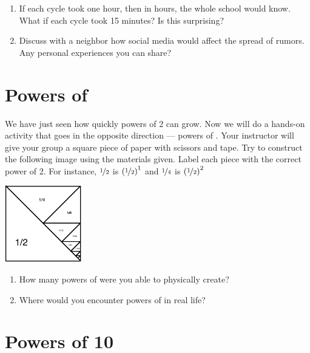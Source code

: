 \documentclass{article}
\begin{document}
\begin{enumerate}
  \vfill

  \clearpage
\item If each cycle took one hour, then in \underline{\hspace{0.5in}} hours, the whole school would know. What if each cycle took 15 minutes? Is this surprising?

  \vfill
  
\item Discuss with a neighbor how social media would affect the spread of rumors. Any
  personal experiences you can share?

  \vfill
  
\end{enumerate}
\section*{Powers of }

We have just seen how quickly powers of 2 can grow. Now we will do a hands-on activity that goes in the opposite direction --- powers of . Your instructor will give your group a square piece of paper with scissors and tape. Try to construct the following image using the materials given. Label each piece with the correct power of 2. For instance, \(\nicefrac12\) is \({\left( \nicefrac12 \right)}^1\) and \(\nicefrac14\) is \({\left( \nicefrac12 \right)}^2\)

\begin{center}
  \includegraphics[width=0.25\textwidth]{square.png}
\end{center}
\begin{enumerate}[resume]
\item How many powers of  were you able to physically create?

  \vfill
  
\item Where would you encounter powers of  in real life?

  \vfill
  
\end{enumerate}

\section*{Powers of 10}
\end{document}
